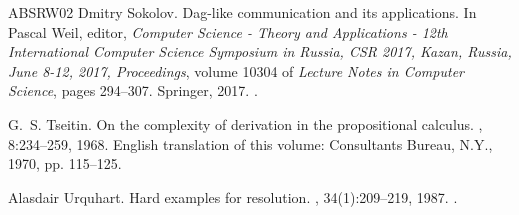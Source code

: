 \documentclass[11pt]{article}
\numberwithin{equation}{section}
\begin{document}
\begin{thebibliography}{ABSRW02}
Dmitry Sokolov.
\newblock Dag-like communication and its applications.
\newblock In Pascal Weil, editor, {\em Computer Science - Theory and
  Applications - 12th International Computer Science Symposium in Russia, {CSR}
  2017, Kazan, Russia, June 8-12, 2017, Proceedings}, volume 10304 of {\em
  Lecture Notes in Computer Science}, pages 294--307. Springer, 2017.
\newblock \href {https://doi.org/10.1007/978-3-319-58747-9\_26}
  {}.

G.~S. Tseitin.
\newblock On the complexity of derivation in the propositional calculus.
, 8:234--259, 1968.
\newblock English translation of this volume: Consultants Bureau, N.Y., 1970,
  pp. 115--125.

Alasdair Urquhart.
\newblock Hard examples for resolution.
, 34(1):209–219, 1987.
\newblock \href {https://doi.org/10.1145/7531.8928}
  {}.

\end{thebibliography}
\end{document}
